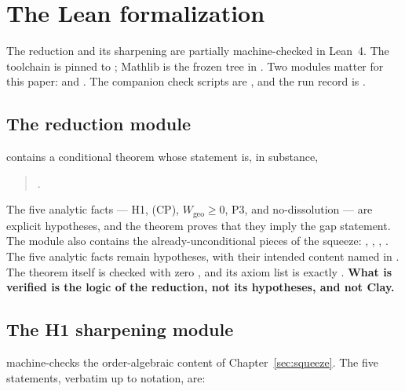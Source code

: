 \clearpage
\appendix

\section{The Lean formalization}
\label{app:lean}

The reduction and its sharpening are partially machine-checked in Lean~4. The toolchain is pinned
to ; Mathlib is the frozen  tree in
. Two modules matter for this paper:
 and . The
companion check scripts are , and the run record is
.

\subsection{The reduction module}

 contains a conditional theorem whose statement is, in substance,
\begin{quote}
.
\end{quote}
The five analytic facts --- H1, (CP), $W_{\mathrm{geo}}\ge0$, P3, and no-dissolution --- are
explicit hypotheses, and the theorem proves that they imply the gap statement. The module also
contains the already-unconditional pieces of the squeeze:
, , ,
. The five analytic facts remain  hypotheses, with
their intended content named in . The theorem itself is checked with
zero , and its axiom list is exactly . \textbf{What is verified is the logic of the reduction, not its hypotheses, and not
Clay.}

\subsection{The H1 sharpening module}

 machine-checks the order-algebraic content of Chapter~\ref{sec:squeeze}.
The five statements, verbatim up to notation, are:

